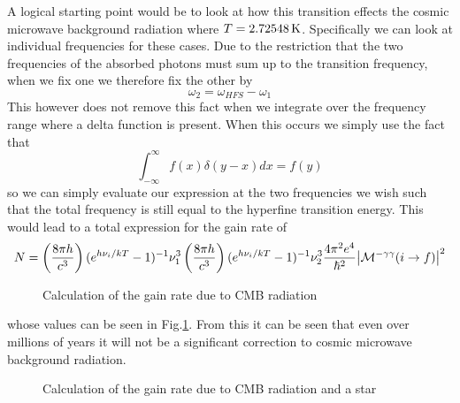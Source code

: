 A logical starting point would be to look at how this transition effects the cosmic microwave background radiation where $T=2.72548\,\rm{K}$. Specifically we can look at individual frequencies for these cases. Due to the restriction that the two frequencies of the absorbed photons must sum up to the transition frequency, when we fix one we therefore fix the other by
\begin{equation}
    \omega_2=\omega_{HFS}-\omega_1
\end{equation}
This however does not remove this fact when we integrate over the frequency range where a delta function is present. When this occurs we simply use the fact that
\begin{equation}
    \int_{-\infty}^\infty f(x) \delta(y-x)dx=f(y)
\end{equation}
so we can simply evaluate our expression at the two frequencies we wish such that the total frequency is still equal to the hyperfine transition energy. This would lead to a total expression for the gain rate of
\begin{equation}
    N=\left(\frac{8\pi h}{c^3}\right)(e^{h\nu_i/kT}-1)^{-1} \nu_1^3
    \left(\frac{8\pi h}{c^3}\right)(e^{h\nu_i/kT}-1)^{-1} \nu_2^3
    \frac{4\pi^2e^4}{\hbar^2}\abs{\mathcal{M}^{-\gamma\gamma}(i\rightarrow f)}^2
\end{equation}
\begin{figure}
    \centering
    \caption{Calculation of the gain rate due to CMB radiation}
    \label{fig:gainrateCMB}
\end{figure}
whose values can be seen in Fig.\ref{fig:gainrateCMB}. From this it can be seen that even over millions of years it will not be a significant correction to cosmic microwave background radiation.
\begin{figure}
    \centering
    \caption{Calculation of the gain rate due to CMB radiation and a star}
    \label{fig:gainrateCMBSUN}
\end{figure}
